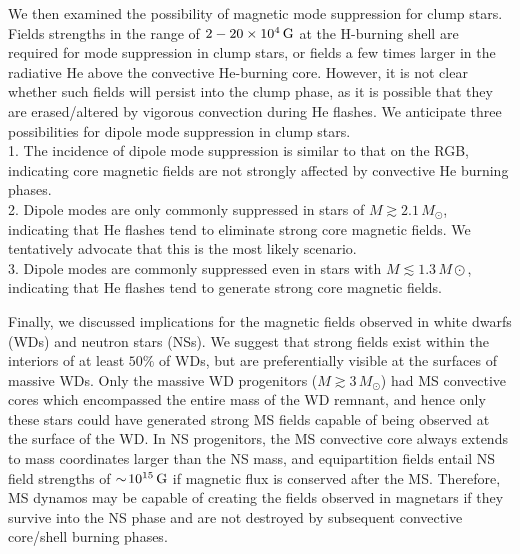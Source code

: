 We then examined the possibility of magnetic mode suppression for clump stars. Fields strengths in the range of $2-20 \times 10^4 \, {\rm G}$ at the H-burning shell are required for mode suppression in clump stars, or fields a few times larger in the radiative He above the convective He-burning core. However, it is not clear whether such fields will persist into the clump phase, as it is possible that they are erased/altered by vigorous convection during He flashes. We anticipate three possibilities for dipole mode suppression in clump stars.\\
1. The incidence of dipole mode suppression is similar to that on the RGB, indicating core magnetic fields are not strongly affected by convective He burning phases. \\
2. Dipole modes are only commonly suppressed in stars of $M \gtrsim 2.1 \, M_\odot$, indicating that He flashes tend to eliminate strong core magnetic fields. We tentatively advocate that this is the most likely scenario. \\
3. Dipole modes are commonly suppressed even in stars with $M \lesssim 1.3 \, M\odot$, indicating that He flashes tend to generate strong core magnetic fields.



Finally, we discussed implications for the magnetic fields observed in white dwarfs (WDs) and neutron stars (NSs). We suggest that strong fields exist within the interiors of at least $50 \%$ of WDs, but are preferentially visible at the surfaces of massive WDs. Only the massive WD progenitors ($M \gtrsim 3 \, M_\odot$) had MS convective cores which encompassed the entire mass of the WD remnant, and hence only these stars could have generated strong MS fields capable of being observed at the surface of the WD. In NS progenitors, the MS convective core always extends to mass coordinates larger than the NS mass, and equipartition fields entail NS field strengths of $\sim \! 10^{15} \, {\rm G}$ if magnetic flux is conserved after the MS. Therefore, MS dynamos may be capable of creating the fields observed in magnetars if they survive into the NS phase and are not destroyed by subsequent convective core/shell burning phases. 
  
  
  
  
  
  
  
  
  
  
  